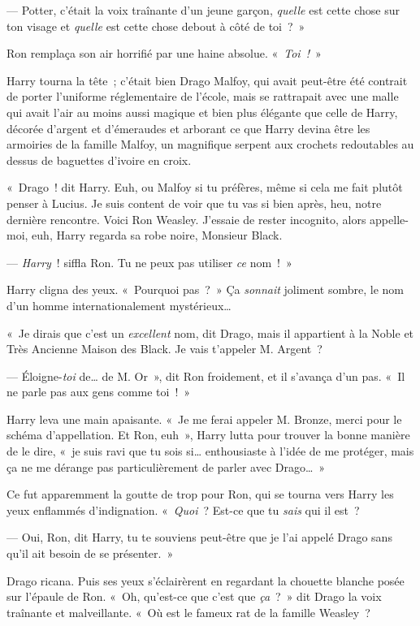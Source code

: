 --- Potter, c'était la voix traînante d'un jeune garçon, \emph{quelle} est cette chose sur ton visage et \emph{quelle} est cette chose debout à côté de toi~?~»

Ron remplaça son air horrifié par une haine absolue. «~\emph{Toi~!}~»

Harry tourna la tête~; c'était bien Drago Malfoy, qui avait peut-être été contrait de porter l'uniforme réglementaire de l'école, mais se rattrapait avec une malle qui avait l'air au moins aussi magique et bien plus élégante que celle de Harry, décorée d'argent et d'émeraudes et arborant ce que Harry devina être les armoiries de la famille Malfoy, un magnifique serpent aux crochets redoutables au dessus de baguettes d'ivoire en croix.

«~Drago~! dit Harry. Euh, ou Malfoy si tu préfères, même si cela me fait plutôt penser à Lucius.
Je suis content de voir que tu vas si bien après, heu, notre dernière rencontre.
Voici Ron Weasley. J'essaie de rester incognito, alors appelle-moi, euh, Harry regarda sa robe noire, Monsieur Black.

--- \emph{Harry}~! siffla Ron. Tu ne peux pas utiliser \emph{ce} nom~!~»

Harry cligna des yeux. «~Pourquoi pas~?~» Ça \emph{sonnait} joliment sombre, le nom d'un homme internationalement mystérieux…

«~Je dirais que c'est un \emph{excellent} nom, dit Drago, mais il appartient à la Noble et Très Ancienne Maison des Black. Je vais t'appeler M. Argent~?

--- Éloigne-\emph{toi} de… de M. Or~», dit Ron froidement, et il s'avança d'un pas. «~Il ne parle pas aux gens comme toi~!~»

Harry leva une main apaisante. «~Je me ferai appeler M. Bronze, merci pour le schéma d'appellation.
Et Ron, euh~», Harry lutta pour trouver la bonne manière de le dire, «~je suis ravi que tu sois si… enthousiaste à l'idée de me protéger, mais ça ne me dérange pas particulièrement de parler avec Drago…~»

Ce fut apparemment la goutte de trop pour Ron, qui se tourna vers Harry les yeux enflammés d'indignation.  «~\emph{Quoi}~?  Est-ce que tu \emph{sais} qui il est~?

--- Oui, Ron, dit Harry, tu te souviens peut-être que je l'ai appelé Drago sans qu'il ait besoin de se présenter.~»

Drago ricana. Puis ses yeux s'éclairèrent en regardant la chouette blanche posée sur l'épaule de Ron.
«~Oh, qu'est-ce que c'est que \emph{ça}~?~» dit Drago la voix traînante et malveillante.
«~Où est le fameux rat de la famille Weasley~?

